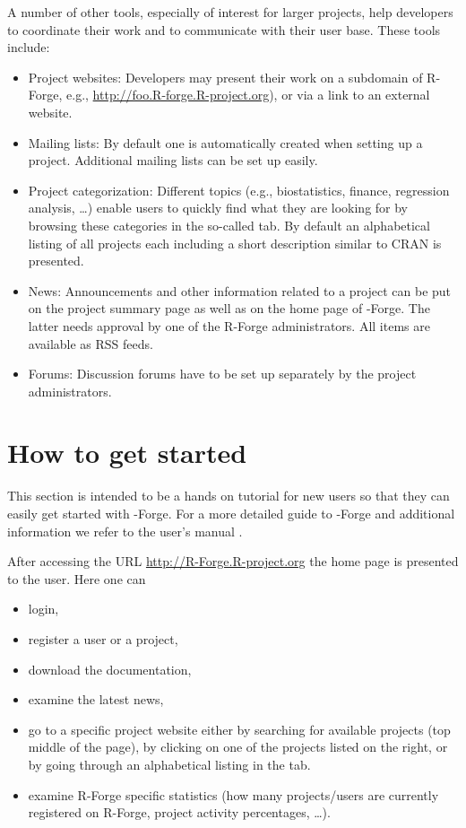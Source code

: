 A number of other tools, especially of interest for larger
projects, help developers to coordinate their work and to communicate
with their user base. These tools include:

\begin{itemize}
\item Project websites: Developers may present their work
  on a subdomain of R-Forge, e.g.,
  \url{http://foo.R-forge.R-project.org}), or via a link to an
  external website.
\item Mailing lists: By default one is automatically created when setting up a
  project. Additional mailing lists can be set up easily. 
\item Project categorization: Different
  topics (e.g., biostatistics, finance, regression analysis,
  \ldots) enable users to quickly find what they are
  looking for by browsing these categories in the so-called
   tab. By default an alphabetical listing of all
  projects each including a short description similar to CRAN is
  presented.
\item News: Announcements and other information related to a project
  can be put on the project summary page as well as on the 
  home page of \R{}-Forge. The latter needs approval by one of the R-Forge
  administrators. All items are available as RSS feeds.
\item Forums: Discussion forums have to be set up separately by the
  project administrators.%
\end{itemize}

\section{How to get started}
This section is intended to be a hands on tutorial for new users so
that they can easily get started with
\R{}-Forge. For a more detailed guide to \R{}-Forge and additional
information we refer to the user's manual
\citep{forge:usermanual:2008}.

After accessing the URL \url{http://R-Forge.R-project.org} the home
page is presented to the user. Here one can
\begin{itemize}
\item login,
\item register a user or a project,
\item download the documentation,
\item examine the latest news,
\item go to a specific project website either by searching for available
  projects (top middle of the page), by clicking on one of the projects
  listed on the right, or by going through an alphabetical listing in
  the  tab. 
\item examine R-Forge specific statistics (how many projects/users
  are currently registered on R-Forge, project activity percentages,
  \ldots{}).
\end{itemize}

